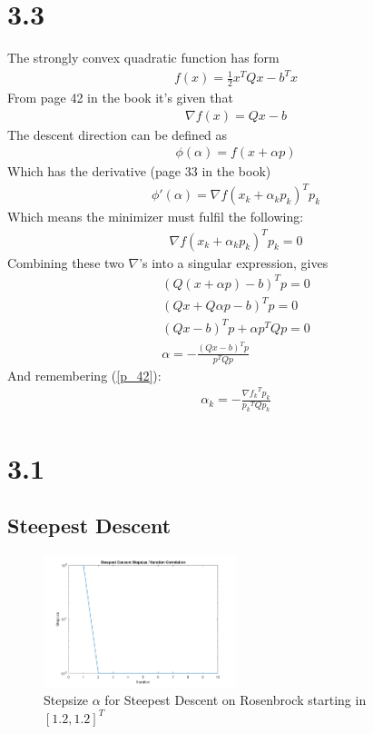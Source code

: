 \documentclass[11pt]{article} %
\begin{document}
\section*{3.3}
The strongly convex quadratic function has form
\begin{gather*}
f(x)=\frac{1}{2}x^T Q x - b^T x
\end{gather*}
From page 42 in the book it's given that
\begin{gather}
\label{p_42}
\nabla f(x) = Q x -b
\end{gather}
The descent direction can be defined as
\begin{gather*}
\phi(\alpha) = f(x+\alpha p)
\end{gather*}
Which has the derivative (page 33 in the book)
\begin{gather*}
\phi'(\alpha) = \nabla f(x_k + \alpha_k p_k)^T p_k
\end{gather*}
Which means the minimizer must fulfil the following:
\begin{gather}
\label{p33derivative}
 \nabla f(x_k + \alpha_k p_k)^T p_k=0
\end{gather}
Combining these two $\nabla$'s into a singular expression, gives
\begin{gather*}
(Q(x+\alpha p) - b)^T p = 0\\
(Qx+Q\alpha p -b)^T p = 0\\
(Qx-b)^T p + \alpha p^T Q p = 0\\
\alpha = -\frac{(Qx - b)^T p}{p^T Q p}
\end{gather*}
And remembering (\ref{p_42}):
\begin{gather}
\alpha_k = - \frac{\nabla {f_k}^T p_k}{{p_k}^T Q p_k}
\end{gather}

\section*{3.1}

\subsection*{Steepest Descent}
\begin{figure}[H]
    \centering
    \includegraphics[width=0.5\textwidth]{steepest_descentfig_1}
    \caption{Stepsize $\alpha$ for Steepest Descent on Rosenbrock starting in $[1.2, 1.2]^T$}
    \label{fig:steepest_1}
\end{figure}
\end{document}
